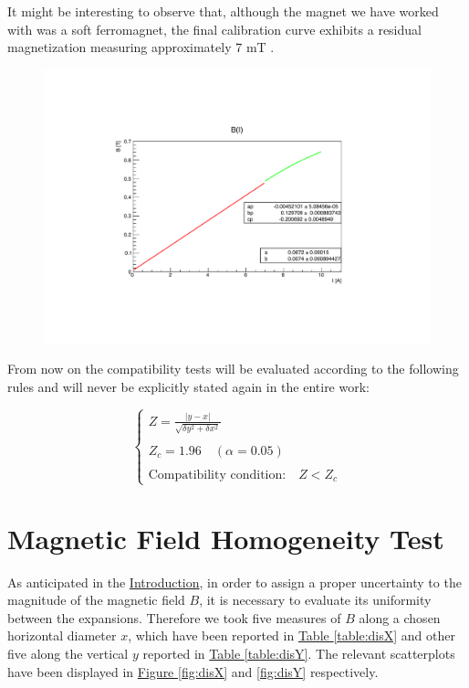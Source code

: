 \documentclass[a4paper,12pt,abstracton]{scrartcl}
\begin{document}
It might be interesting to observe that, although the magnet we have worked with was a soft ferromagnet, the final calibration curve exhibits a residual magnetization measuring approximately 7 mT . 

\begin{figure}[H]
    \centering
    \includegraphics[scale=0.8]{plots/curva.pdf}
    \caption{}
    \label{fig:calcurve}
\end{figure}
From now on the compatibility tests will be evaluated according to the following rules and will never be explicitly stated again in the entire work: 

$$\begin{cases}
Z=\frac{|y-x|}{\sqrt{\delta y^2+ \delta x^2}} \\\\
Z_c = 1.96 \quad(\alpha=0.05) \\\\
\text{Compatibility condition:}\quad Z < Z_c
\end{cases}
$$

\clearpage
\section{Magnetic Field Homogeneity Test}
As anticipated in the \hyperref[sec:Intro]{Introduction}, in order to assign a proper uncertainty to the magnitude of the magnetic field $B$, it is necessary to evaluate its uniformity between the expansions. Therefore we took five measures of $B$ along a chosen horizontal diameter $x$, which have been reported in \hyperref[table:disX]{Table \ref*{table:disX}} and other five along the vertical $y$ reported in \hyperref[table:disY]{Table \ref*{table:disY}}. The relevant scatterplots have been displayed in \hyperref[fig:disX]{Figure \ref*{fig:disX}} and \hyperref[fig:disY]{ \ref*{fig:disY}} respectively.
\end{document}
